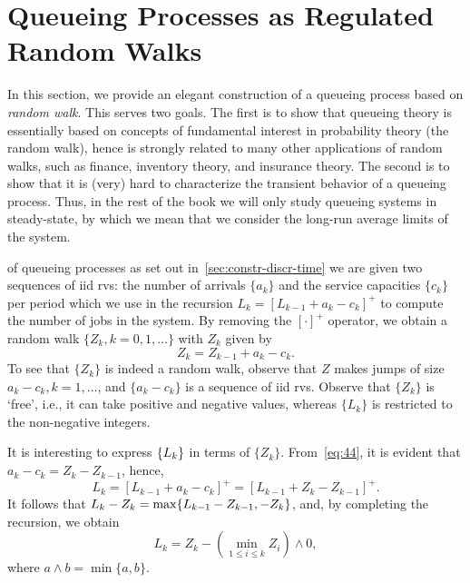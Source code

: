 

\section{Queueing Processes as Regulated Random Walks}
\label{sec:queu-proc-as}


In this section, we provide an elegant construction of a queueing process based on  \emph{random walk}.
This serves two goals.
The first is to show that queueing theory is essentially based on concepts of fundamental interest in probability theory (the random walk), hence is strongly related to many other applications of random walks, such as finance, inventory theory, and insurance theory.
The second is to show that it is (very) hard to characterize the transient behavior of a queueing process.
Thus, in the rest of the book we will only study queueing systems in steady-state, by which we mean that we consider the long-run average limits of the system.




 of queueing processes as set out in~\cref{sec:constr-discr-time} we are given two sequences of iid rvs: the number of arrivals $\{a_k\}$  and the service capacities $\{c_k\}$ per period  which we use  in the recursion $L_k = [L_{k-1} +a_k- c_{k}]^+$ to
compute the number of jobs in the system.
By removing the $[\cdot]^{+}$ operator, we obtain a random walk $\{Z_k, k=0,1,\ldots\}$ with $Z_k$ given by
\begin{equation}\label{eq:44}
 Z_k = Z_{k-1} + a_k - c_k.
\end{equation}
To see that $\{Z_k\}$ is indeed a random walk, observe that $Z$ makes jumps of size $a_k-c_k, k=1,\ldots$, and $\{a_k-c_k\}$ is a sequence of iid rvs. Observe that $\{Z_k\}$ is `free', i.e., it can take positive and negative values, whereas $\{L_{k}\}$ is restricted to the non-negative integers.

It is interesting to express $\{L_k\}$ in terms of $\{Z_k\}$. From~\cref{eq:44}, it is evident that $a_k - c_k = Z_k - Z_{k-1}$, hence,
\begin{equation*}
 L_k = [L_{k-1} +a_k- c_{k}]^+ = [L_{k-1} +Z_k- Z_{k-1}]^+.
\end{equation*}
It follows that  $L_k - Z_{k} = \max\{L_{k-1} - Z_{k-1}, -Z_k\}$,
and, by completing the recursion, we obtain
\begin{equation}\label{eq:reich1}
 L_k = Z_k - \left(\min_{1\leq i \leq k} Z_i\right)\wedge 0,
\end{equation}
where $a\wedge b = \min\{a,b\}$.

